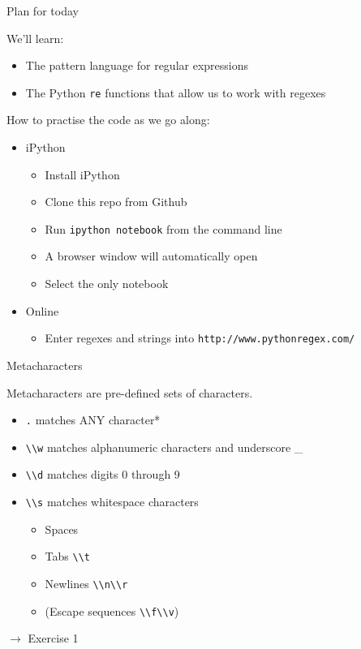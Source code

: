 \documentclass{beamer}
\begin{document}
\begin{frame}{Plan for today}

We'll learn:
\begin{itemize}
 \item The pattern language for regular expressions
 \item The Python \lstinline$re$ functions that allow us to work with regexes
\end{itemize}

How to practise the code as we go along:
\begin{itemize}
 \item iPython
   \begin{itemize}
    \item Install iPython
    \item Clone this repo from Github %
    \item Run \lstinline$ipython notebook$ from the command line
    \item A browser window will automatically open
    \item Select the only notebook
   \end{itemize}
 \item Online
   \begin{itemize}
    \item Enter regexes and strings into \lstinline$http://www.pythonregex.com/$
   \end{itemize}
\end{itemize}

\end{frame}

\begin{frame}{Metacharacters}

Metacharacters are pre-defined sets of characters.
 \begin{itemize}
  \item \lstinline$.$ matches ANY character*
  \item \lstinline$\\w$ matches alphanumeric characters and underscore \_
  \item \lstinline$\\d$ matches digits 0 through 9
  \item \lstinline$\\s$ matches whitespace characters
    \begin{itemize}
     \item Spaces 
     \item Tabs \lstinline$\\t$
     \item Newlines \lstinline$\\n\\r$
     \item (Escape sequences \lstinline$\\f\\v$)
    \end{itemize}
 \end{itemize}

 \bigskip
 $\rightarrow$ Exercise 1
\end{frame}
\end{document}
